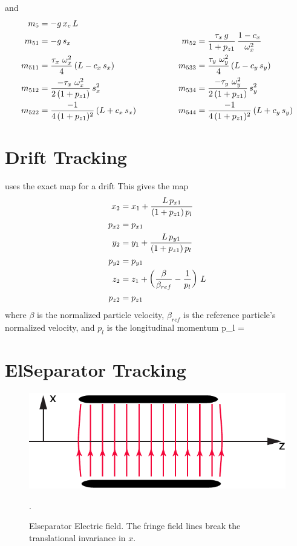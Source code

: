 and
\begin{alignat}{2}
  m_5     &= -g \, x_c \, L & \qquad \qquad & \nonumber \\
  m_{51}  &= -g \, s_x & \qquad \qquad
  m_{52}  &= \frac{\tau_x \, g}{1 + p_{z1}} \, \frac{1 - c_x}{\omega_x^2} \nonumber \\
  m_{511} &= \frac{\tau_x \,\, \omega_x^2}{4} \, (L - c_x \, s_x) & \qquad \qquad
  m_{533} &= \frac{\tau_y \,\, \omega_y^2}{4} \, (L - c_y \, s_y) \nonumber \\
  m_{512} &= \frac{-\tau_x \,\, \omega_x^2}{2 \, (1 + p_{z1})} \, s_x^2 & \qquad \qquad
  m_{534} &= \frac{-\tau_y \,\, \omega_y^2}{2 \, (1 + p_{z1})} \, s_y^2 \nonumber \\
  m_{522} &= \frac{-1}{4 \, (1 + p_{z1})^2} \, (L + c_x \, s_x) & \qquad \qquad
  m_{544} &= \frac{-1}{4 \, (1 + p_{z1})^2} \, (L + c_y \, s_y) \nonumber
\end{alignat}

\section{Drift Tracking}
\label{s:drift.std}

\bmad uses the exact map for a drift
This gives the map
\begin{align}
  x_2    &= x_1 + \frac{L \, p_{x1}}{(1 + p_{z1}) \, p_l} \nonumber \\
  p_{x2} &= p_{x1}  \nonumber \\
  y_2    &= y_1 + \frac{L \, p_{y1}}{(1 + p_{z1}) \, p_l} \nonumber \\
  p_{y2} &= p_{y1}  \\
  z_2    &= z_1 + \left( \frac{\beta}{\beta_{ref}} - \frac{1}{p_l} \right) \, L \nonumber \\
  p_{z2} &= p_{z1} \nonumber
\end{align}
where $\beta$ is the normalized particle velocity, $\beta_{ref}$ is 
the reference particle's normalized velocity, and $p_l$ is the
longitudinal momentum
\Begineq
  p_l = 
\Endeq

\section{ElSeparator Tracking}
\label{s:elsep.std}

\begin{figure}[tb]
  \centering
  \includegraphics[width=5in]{elseparator.pdf}
  \caption[ElSeparator electric field.]
  {
Elseparator Electric field. The fringe field lines break the
translational invariance in $x$.
  }
  \label{f:elsep}.
\end{figure}

